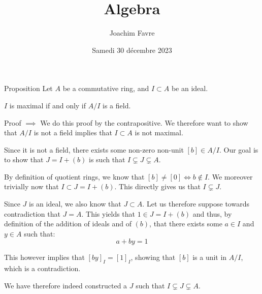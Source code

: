 \documentclass[a4paper]{article}
\title{Algebra}
\author{Joachim Favre}
\date{Samedi 30 décembre 2023}
\begin{document}
\maketitle


\begin{parag}{Proposition}
    Let $A$ be a commutative ring, and $I \subset A$ be an ideal.

    $I$ is maximal if and only if $A / I$ is a field.

    \begin{subparag}{Proof $\implies$}
        We do this proof by the contrapositive. We therefore want to show that $A/I$ is not a field implies that $I \subset A$ is not maximal.

        Since it is not a field, there exists some non-zero non-unit $\left[b\right] \in A/I$. Our goal is to show that $J = I + \left(b\right)$ is such that $I \subsetneq J \subsetneq A$. 

        By definition of quotient rings, we know that $\left[b\right] \neq \left[0\right] \iff b \notin I$. We moreover trivially now that $I \subset J = I + \left(b\right)$. This directly gives us that $I \subsetneq J$.

        Since $J$ is an ideal, we also know that $J \subset A$. Let us therefore suppose towards contradiction that $J = A$. This yields that $1 \in J = I + \left(b\right)$ and thus, by definition of the addition of ideals and of $\left(b\right)$, that there exists some $a \in I$ and $y \in A$ such that: 
        \[a + by = 1\]
        
        This however implies that $\left[by\right]_{I} = \left[1\right]_{I}$, showing that $\left[b\right]$ is a unit in $A/I$, which is a contradiction. 

        We have therefore indeed constructed a $J$ such that $I \subsetneq J \subsetneq A$.
    \end{subparag}


\end{parag}
\end{document}
